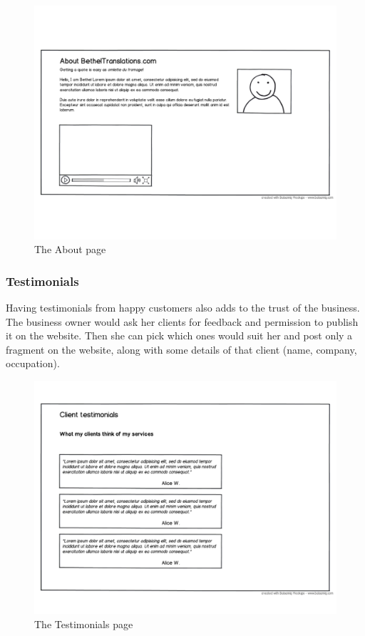 \documentclass{l3proj}
\begin{document}
\begin{figure}
\label{wireframes:about}
\begin{center}
\includegraphics[width=\linewidth, trim = 0px 110px 0px 100px]{wireframes/about}
\caption{The About page}
\end{center}
\end{figure}


\subsubsection{Testimonials}
Having testimonials from happy customers also adds to the trust of the business.
The business owner would ask her clients for feedback and permission to publish
it on the website. Then she can pick which ones would suit her and post only a
fragment on the website, along with some details of that client (name, company,
occupation).

\begin{figure}
\label{wireframes:testimonials}
\begin{center}
\includegraphics[width=\linewidth, trim = 0px 80px 0px 220px]
	{wireframes/testimonials}
\caption{The Testimonials page}
\end{center}
\end{figure}
\end{document}
